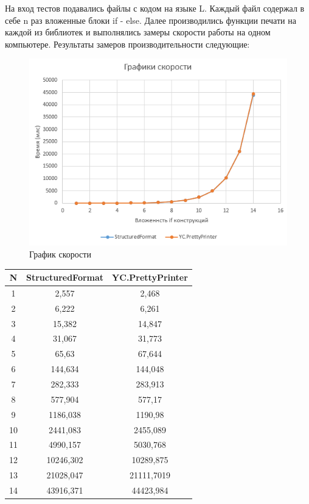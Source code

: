 \documentclass{matmex-diploma}
\begin{document}
На вход тестов подавались файлы с кодом на языке L. Каждый файл содержал в себе n раз вложенные блоки if - else. Далее производились функции печати на каждой из библиотек и выполнялись замеры скорости работы на одном компьютере. Результаты замеров производительности следующие:
\begin{figure}[h]
    \centering
	\includegraphics[scale = 1.0]{Images/diagram.PNG}
	\caption{График скорости}
\end{figure}
\begin{table}
    \centering
    \begin{tabular}{|c|c|c|}
    \hline
    N  & StructuredFormat & YC.PrettyPrinter \\ \hline
    1  & 2,557            & 2,468            \\ \hline
    2  & 6,222            & 6,261            \\ \hline
    3  & 15,382           & 14,847           \\ \hline
    4  & 31,067           & 31,773           \\ \hline
    5  & 65,63            & 67,644           \\ \hline
    6  & 144,634          & 144,048          \\ \hline
    7  & 282,333          & 283,913          \\ \hline
    8  & 577,904          & 577,17           \\ \hline
    9  & 1186,038         & 1190,98          \\ \hline
    10 & 2441,083         & 2455,089         \\ \hline
    11 & 4990,157         & 5030,768         \\ \hline
    12 & 10246,302        & 10289,875        \\ \hline
    13 & 21028,047        & 21111,7019       \\ \hline
    14 & 43916,371        & 44423,984        \\ \hline
    \end{tabular}
\end{table}
\newpage
\end{document}
